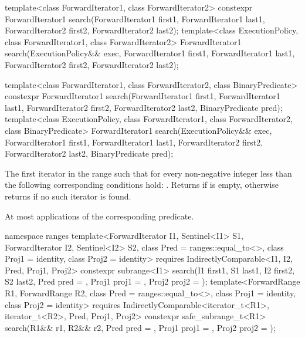 %
\begin{itemdecl}
template<class ForwardIterator1, class ForwardIterator2>
  constexpr ForwardIterator1
    search(ForwardIterator1 first1, ForwardIterator1 last1,
           ForwardIterator2 first2, ForwardIterator2 last2);
template<class ExecutionPolicy, class ForwardIterator1, class ForwardIterator2>
  ForwardIterator1
    search(ExecutionPolicy&& exec,
           ForwardIterator1 first1, ForwardIterator1 last1,
           ForwardIterator2 first2, ForwardIterator2 last2);

template<class ForwardIterator1, class ForwardIterator2,
         class BinaryPredicate>
  constexpr ForwardIterator1
    search(ForwardIterator1 first1, ForwardIterator1 last1,
           ForwardIterator2 first2, ForwardIterator2 last2,
           BinaryPredicate pred);
template<class ExecutionPolicy, class ForwardIterator1, class ForwardIterator2,
         class BinaryPredicate>
  ForwardIterator1
    search(ExecutionPolicy&& exec,
           ForwardIterator1 first1, ForwardIterator1 last1,
           ForwardIterator2 first2, ForwardIterator2 last2,
           BinaryPredicate pred);
\end{itemdecl}

\begin{itemdescr}
\pnum
\returns
The first iterator  in the range 
such that
for every non-negative integer  less than 
the following corresponding conditions hold:
.
Returns  if  is empty,
otherwise returns  if no such iterator is found.

\pnum
\complexity
At most  applications
of the corresponding predicate.
\end{itemdescr}

%
\begin{itemdecl}
namespace ranges {
  template<ForwardIterator I1, Sentinel<I1> S1, ForwardIterator I2,
           Sentinel<I2> S2, class Pred = ranges::equal_to<>,
           class Proj1 = identity, class Proj2 = identity>
    requires IndirectlyComparable<I1, I2, Pred, Proj1, Proj2>
    constexpr subrange<I1>
      search(I1 first1, S1 last1, I2 first2, S2 last2, Pred pred = {},
             Proj1 proj1 = {}, Proj2 proj2 = {});
  template<ForwardRange R1, ForwardRange R2, class Pred = ranges::equal_to<>,
           class Proj1 = identity, class Proj2 = identity>
    requires IndirectlyComparable<iterator_t<R1>, iterator_t<R2>, Pred, Proj1, Proj2>
    constexpr safe_subrange_t<R1>
      search(R1&& r1, R2&& r2, Pred pred = {},
             Proj1 proj1 = {}, Proj2 proj2 = {});
}
\end{itemdecl}

